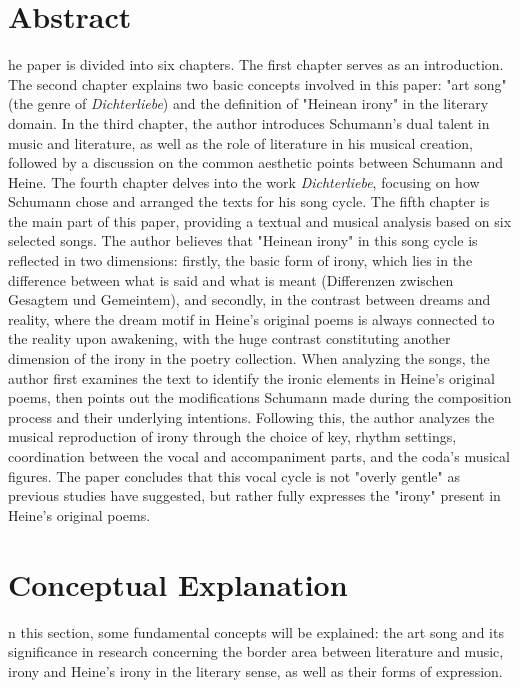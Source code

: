 \documentclass[10pt,a4paper,onecolumn]{rho}
\begin{document}
\section{Abstract}
    he paper is divided into six chapters. The first chapter serves as an introduction. The second chapter explains two basic concepts involved in this paper: "art song" (the genre of \textit{Dichterliebe}) and the definition of "Heinean irony" in the literary domain. In the third chapter, the author introduces Schumann's dual talent in music and literature, as well as the role of literature in his musical creation, followed by a discussion on the common aesthetic points between Schumann and Heine. The fourth chapter delves into the work \textit{Dichterliebe}, focusing on how Schumann chose and arranged the texts for his song cycle. The fifth chapter is the main part of this paper, providing a textual and musical analysis based on six selected songs. The author believes that "Heinean irony" in this song cycle is reflected in two dimensions: firstly, the basic form of irony, which lies in the difference between what is said and what is meant (Differenzen zwischen Gesagtem und Gemeintem), and secondly, in the contrast between dreams and reality, where the dream motif in Heine's original poems is always connected to the reality upon awakening, with the huge contrast constituting another dimension of the irony in the poetry collection. When analyzing the songs, the author first examines the text to identify the ironic elements in Heine's original poems, then points out the modifications Schumann made during the composition process and their underlying intentions. Following this, the author analyzes the musical reproduction of irony through the choice of key, rhythm settings, coordination between the vocal and accompaniment parts, and the coda's musical figures. The paper concludes that this vocal cycle is not "overly gentle" as previous studies have suggested, but rather fully expresses the "irony" present in Heine's original poems.

\section{Conceptual Explanation}
n this section, some fundamental concepts will be explained: the art song and its significance in research concerning the border area between literature and music, irony and Heine's irony in the literary sense, as well as their forms of expression.
\end{document}
